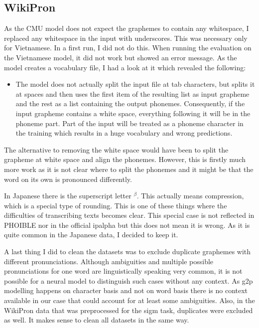 \subsection*{WikiPron} 
As the CMU model does not expect the graphemes to contain any whitespace, I replaced any whitespace in the input with underscores. This was necessary only for Vietnamese. In a first run, I did not do this. When running the evaluation on the Vietnamese model, it did not work but showed an error message. As the model creates a vocabulary file, I had a look at it which revealed the following: 
\begin{itemize}
\item The model does not actually split the input file at tab characters, but splits it at spaces and then uses the first item of the resulting list as input grapheme and the rest as a list containing the output phonemes. Consequently, if the input grapheme contains a white space, everything following it will be in the phoneme part. Part of the input will be treated as a phoneme character in the training which results in a huge vocabulary and wrong predictions.
\end{itemize}

The alternative to removing the white space would have been to split the grapheme at white space and align the phonemes. However, this is firstly much more work as it is not clear where to split the phonemes and it might be that the word on its own is pronounced differently. 

In Japanese there is the superscript letter $^\beta$. This actually means compression, which is a special type of rounding. This is one of these things where the difficulties of transcribing texts becomes clear. This special case is not reflected in PHOIBLE nor in the official \ac{ipalpha} but this does not mean it is wrong. As it is quite common in the Japanese data, I decided to keep it.

A last thing I did to clean the datasets was to exclude duplicate graphemes with different pronunciations. Although ambiguities and multiple possible pronunciations for one word are linguistically speaking very common, it is not possible for a neural model to distinguish such cases without any context. As \ac{g2p} modelling happens on character basis and not on word basis there is no context available in our case that could account for at least some ambiguities. Also, in the WikiPron data that was preprocessed for the \ac{sigm} task, duplicates were excluded as well. It makes sense to clean all datasets in the same way.


